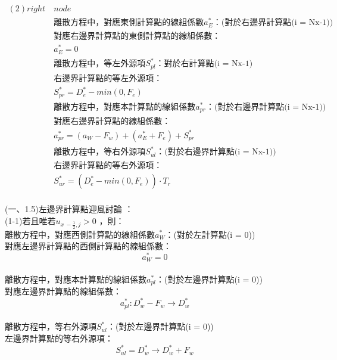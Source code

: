 \documentclass[12pt]{article}
\begin{document}
\begin{equation}
    \begin{split}
        (2)right\ &node \\
        &\mbox{離散方程中，對應東側計算點的線組係數$a_{E}^{*}$：(對於右邊界計算點(i = Nx-1))}\\    
        &\mbox{對應右邊界計算點的東側計算點的線組係數：}\\
        &a_{E}^{*} = 0\\
        &\mbox{離散方程中，等左外源項$S_{pl}^{*}$：對於右計算點(i = Nx-1)}\\
        &\mbox{右邊界計算點的等左外源項：}\\
        &S_{pr}^{*} = D_{e}^{*} -min(0,F_{e}) \\
        &\mbox{離散方程中，對應本計算點的線組係數$a_{pr}^{*}$：(對於右邊界計算點(i = Nx-1))}\\    
        &\mbox{對應右邊界計算點的線組係數：}\\
        &a_{pr}^{*} = (a_{W}-F_{w}) + (a_{E}^{*} + F_{e}) + S_{pr}^{*} \\
        &\mbox{離散方程中，等右外源項$S_{ul}^{*}$：(對於右邊界計算點(i = Nx-1))}\\
        &\mbox{右邊界計算點的等右外源項：}\\
        &S_{ur}^{*} = (D_{e}^{*}  - min(0 , F_{e} ))\cdot T_{r}\\
\end{split}
\end{equation}

\vspace{0.7em}

\noindent (一、1.5)左邊界計算點迎風討論 ：\\

\noindent (1-1)若且唯若$u_{x\ -\frac{1}{2} ,j} > 0$ ，則：\\
離散方程中，對應西側計算點的線組係數$a_{W}^{*}$：(對於左計算點(i = 0))\\
對應左邊界計算點的西側計算點的線組係數：\\
$$a_{W}^{*} = 0$$\\
離散方程中，對應本計算點的線組係數$a_{pl}^{*}$：(對於左邊界計算點(i = 0))\\
對應左邊界計算點的線組係數：\\
$$a_{pl}^{*} : D_{w}^{*} - F_{w} \rightarrow D_{w}^{*}$$\\
離散方程中，等右外源項$S_{ul}^{*}$：(對於左邊界計算點(i = 0))\\
左邊界計算點的等右外源項：\\
$$S_{ul}^{*} = D_{w}^{*} \rightarrow D_{w}^{*}+F_{w}$$\\
\end{document}
